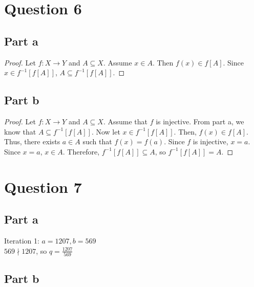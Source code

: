 \documentclass{article}
\begin{document}
\section*{Question 6}

\subsection*{Part a}
\begin{proof}
    Let $f: X \to Y$ and $A \subseteq X$.
    Assume $x \in A$.
    Then $f(x) \in f[A]$.
    Since $x \in f^{-1}[f[A]]$, $A \subseteq f^{-1}[f[A]]$.
\end{proof}

\subsection*{Part b}
\begin{proof}
    Let $f: X \to Y$ and $A \subseteq X$.
    Assume that $f$ is injective.
    From part a, we know that $A \subseteq f^{-1}[f[A]]$.
    Now let $x \in f^{-1}[f[A]]$.
    Then, $f(x) \in f[A]$.
    Thus, there exists $a \in A$ such that $f(x) = f(a)$.
    Since $f$ is injective, $x = a$.
    Since $x = a$, $x \in A$.
    Therefore, $f^{-1}[f[A]] \subseteq A$, so $f^{-1}[f[A]] = A$.
\end{proof}

\section*{Question 7}

\subsection*{Part a}
Iteration 1: $a = 1207, b = 569$ \\
$569 \nmid 1207$, so $q = \frac{1207}{569}$

\subsection*{Part b}
\end{document}
